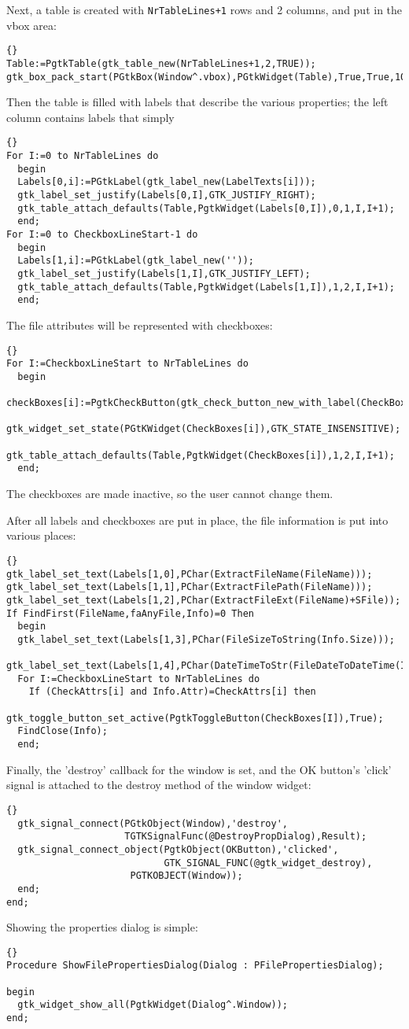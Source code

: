 \documentclass[10pt]{article}
\begin{document}
Next, a table is created with \lstinline|NrTableLines+1| rows and 2 columns,
and put in the vbox area:
\begin{lstlisting}{}
Table:=PgtkTable(gtk_table_new(NrTableLines+1,2,TRUE));
gtk_box_pack_start(PGtkBox(Window^.vbox),PGtkWidget(Table),True,True,10);
\end{lstlisting}
Then the table is filled with labels that describe the various properties;
the left column contains labels that simply
\begin{lstlisting}{}
For I:=0 to NrTableLines do
  begin 
  Labels[0,i]:=PGtkLabel(gtk_label_new(LabelTexts[i]));
  gtk_label_set_justify(Labels[0,I],GTK_JUSTIFY_RIGHT);
  gtk_table_attach_defaults(Table,PgtkWidget(Labels[0,I]),0,1,I,I+1); 
  end;
For I:=0 to CheckboxLineStart-1 do
  begin 
  Labels[1,i]:=PGtkLabel(gtk_label_new(''));
  gtk_label_set_justify(Labels[1,I],GTK_JUSTIFY_LEFT);
  gtk_table_attach_defaults(Table,PgtkWidget(Labels[1,I]),1,2,I,I+1); 
  end;
\end{lstlisting}
The file attributes will be represented with checkboxes:
\begin{lstlisting}{}
For I:=CheckboxLineStart to NrTableLines do
  begin
  checkBoxes[i]:=PgtkCheckButton(gtk_check_button_new_with_label(CheckBoxTexts[I]));
  gtk_widget_set_state(PGtKWidget(CheckBoxes[i]),GTK_STATE_INSENSITIVE);
  gtk_table_attach_defaults(Table,PgtkWidget(CheckBoxes[i]),1,2,I,I+1); 
  end;  
\end{lstlisting}
The checkboxes are made inactive, so the user cannot change them.

After all labels and checkboxes are put in place, the file information
is put into various places:
\begin{lstlisting}{}
gtk_label_set_text(Labels[1,0],PChar(ExtractFileName(FileName)));
gtk_label_set_text(Labels[1,1],PChar(ExtractFilePath(FileName)));
gtk_label_set_text(Labels[1,2],PChar(ExtractFileExt(FileName)+SFile));
If FindFirst(FileName,faAnyFile,Info)=0 Then
  begin
  gtk_label_set_text(Labels[1,3],PChar(FileSizeToString(Info.Size)));
  gtk_label_set_text(Labels[1,4],PChar(DateTimeToStr(FileDateToDateTime(Info.Time))));
  For I:=CheckboxLineStart to NrTableLines do
    If (CheckAttrs[i] and Info.Attr)=CheckAttrs[i] then
      gtk_toggle_button_set_active(PgtkToggleButton(CheckBoxes[I]),True);
  FindClose(Info);
  end;
\end{lstlisting}
Finally, the 'destroy' callback for the window is set, and the OK button's
'click' signal is attached to the destroy method of the window widget:
\begin{lstlisting}{}
  gtk_signal_connect(PGtkObject(Window),'destroy',
                     TGTKSignalFunc(@DestroyPropDialog),Result);
  gtk_signal_connect_object(PgtkObject(OKButton),'clicked',
                            GTK_SIGNAL_FUNC(@gtk_widget_destroy),
                      PGTKOBJECT(Window));
  end;    
end;
\end{lstlisting}
Showing the properties dialog is simple:
\begin{lstlisting}{}
Procedure ShowFilePropertiesDialog(Dialog : PFilePropertiesDialog);

begin
  gtk_widget_show_all(PgtkWidget(Dialog^.Window));
end;
\end{lstlisting}
\end{document}
